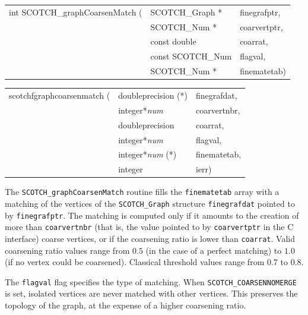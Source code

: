 \begin{itemize}
\progsyn

{\tt\begin{tabular}{l@{}ll}
int SCOTCH\_graphCoarsenMatch ( & SCOTCH\_Graph *   & finegrafptr, \\
                                & SCOTCH\_Num *     & coarvertptr, \\
                                & const double      & coarrat,     \\
                                & const SCOTCH\_Num & flagval,     \\
                                & SCOTCH\_Num *     & finematetab) \\
\end{tabular}}

{\tt\begin{tabular}{l@{}ll}
scotchfgraphcoarsenmatch ( & doubleprecision (*)   & finegrafdat, \\
                           & integer*{\it num}     & coarvertnbr, \\
                           & doubleprecision       & coarrat,     \\
                           & integer*{\it num}     & flagval,     \\
                           & integer*{\it num} (*) & finematetab, \\
                           & integer               & ierr)
\end{tabular}}

\progdes

The {\tt SCOTCH\_graphCoarsenMatch} routine fills the
{\tt fine\lbt mate\lbt tab} array with a matching of the vertices of
the {\tt SCOTCH\_\lbt Graph} structure {\tt fine\lbt graf\lbt dat}
pointed to by {\tt fine\lbt graf\lbt ptr}. The matching is
computed only if it amounts to the creation of more than
{\tt coar\lbt vert\lbt nbr} (that is, the value pointed to by
{\tt coar\lbt vert\lbt ptr} in the C interface) coarse vertices, or if
the coarsening ratio is lower than {\tt coarrat}. Valid coarsening
ratio values range from $0.5$ (in the case of a perfect matching) to
$1.0$ (if no vertex could be coarsened). Classical threshold values
range from $0.7$ to $0.8$.

The {\tt flagval} flag specifies the type of matching.
When {\tt SCOTCH\_\lbt COARSEN\lbt NO\lbt MERGE} is set, isolated
vertices are never matched with other vertices. This preserves the
topology of the graph, at the expense of a higher coarsening ratio.


\end{itemize}

